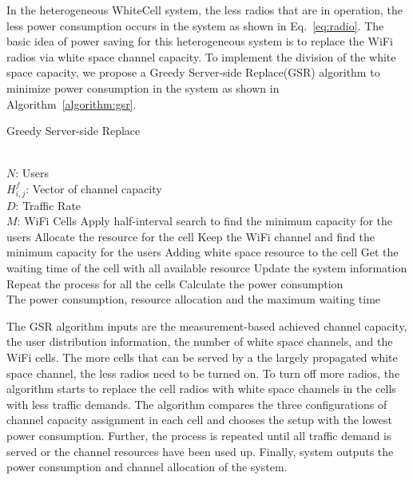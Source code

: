 In the heterogeneous WhiteCell system, the less radios that are in operation, the less power consumption occurs 
in the system as shown in Eq.~\ref{eq:radio}. 
The basic idea of power saving for this heterogeneous system is to replace the WiFi radios via 
white space channel capacity. To implement the division of the white space capacity, we propose a 
Greedy Server-side Replace(GSR) algorithm to minimize power consumption in the system 
as shown in Algorithm~\ref{algorithm:gsr}. 

\begin{algorithm}[t]
\small
\caption{Greedy Server-side Replace}
\label{algorithm:gsr}
\begin{algorithmic}[1]
\REQUIRE  ~~\\
$N$: Users\\
$H_{i,j}^f$: Vector of channel capacity\\
$D$: Traffic Rate\\
$M$: WiFi Cells
\STATE Apply half-interval search to find the minimum capacity for the users
\STATE Allocate the resource for the cell
\STATE Keep the WiFi channel and find the minimum capacity for the users
\STATE Adding white space resource to the cell
\ENDIF
\ELSE 
\STATE Get the waiting time of the cell with all available resource
\ENDIF
\STATE Update the system information
\STATE Repeat the process for all the cells
\STATE Calculate the power consumption
\ENSURE ~~\\
The power consumption, resource allocation and the maximum waiting time\\
\end{algorithmic}
\end{algorithm}

The GSR algorithm inputs are the measurement-based achieved channel capacity, the user distribution 
information, the number of white space channels, and the WiFi cells. 
The more cells that can be served by a the largely propagated white space channel, the less radios need to 
be turned on.
To turn off more radios, the algorithm starts to replace the cell radios with white space channels in the 
cells with less traffic demands.
The algorithm compares the three configurations of channel capacity assignment in each cell and chooses the 
setup with the lowest power consumption. Further, the process is repeated until all traffic demand is served or the 
channel resources have been used up.
Finally, system outputs the power consumption and channel allocation of the system.

